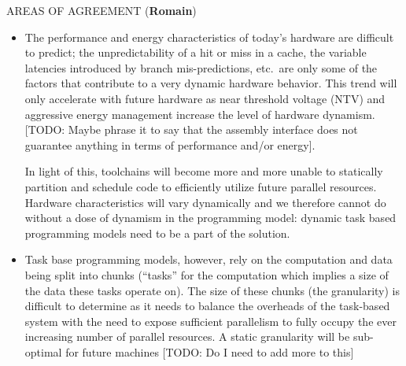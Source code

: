 AREAS OF AGREEMENT (\textbf{Romain})
          \begin{itemize}
          \item{
              The performance and energy characteristics of today's
hardware are difficult to predict; the unpredictability of a hit or
miss in a cache, the variable latencies introduced by branch
mis-predictions, etc.\ are only some of the factors that contribute to
a very dynamic hardware behavior. This trend will only accelerate with
future hardware as near threshold voltage (NTV) and aggressive energy
management increase the level of hardware dynamism. [TODO: Maybe
phrase it to say that the assembly interface does not guarantee
anything in terms of performance and/or energy].

              In light of this, toolchains will become more and more
unable to statically partition and schedule code to efficiently
utilize future parallel resources. Hardware characteristics will vary
dynamically and we therefore cannot do without a dose of dynamism in
the programming model: dynamic task based programming models need to
be a part of the solution.
            }
          \item{
              Task base programming models, however, rely on the
computation and data being split into chunks (``tasks'' for the
computation which implies a size of the data these tasks operate
on). The size of these chunks (the granularity) is difficult to
determine as it needs to balance the overheads of the task-based
system with the need to expose sufficient parallelism to fully occupy
the ever increasing number of parallel resources. A static granularity
will be sub-optimal for future machines [TODO: Do I need to add more
to this]
            }
          \end{itemize}




